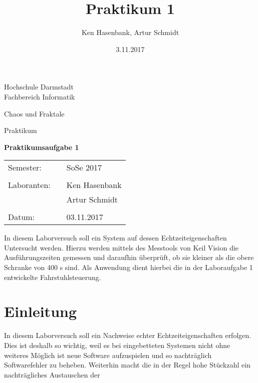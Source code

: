 \documentclass[10pt,a4paper]{article}
\author{Ken Hasenbank, Artur Schmidt}
\title{Praktikum 1}
\date{3.11.2017}
\begin{document}

\begin{titlepage}
\begin{center}
	\Large{Hochschule Darmstadt}\\
	\large{Fachbereich Informatik}
\end{center}

\vspace{1cm}
\begin{center}
	\large{Chaos und Fraktale}
\end{center}

\vspace{2,5cm}
\begin{center}
	\huge{Praktikum}\\
\end{center}

\begin{center}
	\Huge{\textbf{Praktikumsaufgabe 1}} 
\end{center}


\vspace{6cm}
\begin{center}
{\large 
\begin{tabular}{lll}
	Semester: && SoSe 2017\\
	\vspace{1mm}\\
	Laboranten: && Ken Hasenbank\\
	&& Artur Schmidt\\
	\vspace{1 mm}\\
	Datum:	&& 03.11.2017\\
	\end{tabular} 
	}%
\end{center}

\end{titlepage}

\tableofcontents
\newpage
In diesem Laborversuch soll ein System auf dessen Echtzeiteigenschaften Untersucht werden. Hierzu werden mittels des Messtools von Keil \textmu{}Vision die Ausführungszeiten gemessen und daraufhin überprüft, ob sie kleiner als die obere Schranke von 400 \textmu{}s sind. Als Anwendung dient hierbei die in der Laboraufgabe 1 entwickelte Fahrstuhlsteuerung. 
\section{Einleitung}
In diesem Laborversuch soll ein Nachweise echter Echtzeiteigenschaften erfolgen. Dies ist deshalb so wichtig, weil es bei eingebetteten Systemen nicht ohne weiteres Möglich ist neue Software aufzuspielen und so nachträglich Softwarefehler zu beheben. Weiterhin macht die in der Regel hohe Stückzahl ein nachträgliches Austauschen der 
\newpage
\end{document}
